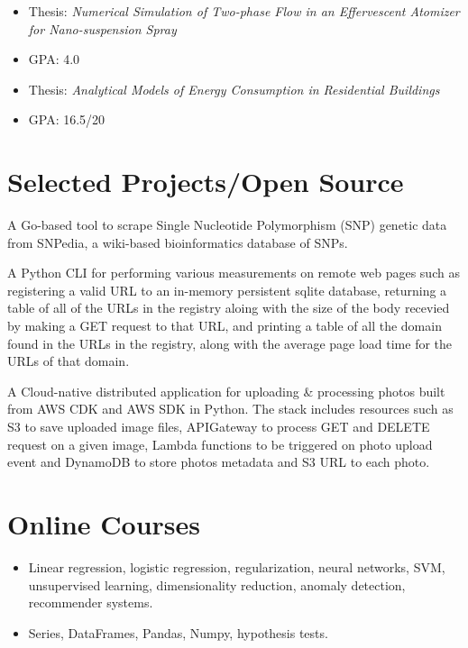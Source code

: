 \documentclass[11pt,a4paper,sans]{moderncv}
\begin{document}
{ \begin{itemize} \itemsep -1pt
  \item Thesis: \textit{Numerical Simulation of Two-phase Flow in an Effervescent Atomizer for Nano-suspension Spray}\item GPA: 4.0
\end{itemize} }

{ \begin{itemize} \itemsep -1pt
  \item Thesis: \textit{Analytical Models of Energy Consumption in Residential Buildings}
  \item GPA: 16.5/20
\end{itemize} }

\section{\textbf{Selected Projects/Open Source}}

  {A Go-based tool to scrape Single Nucleotide Polymorphism (SNP) genetic data from SNPedia, a wiki-based bioinformatics database of SNPs.}

  {A Python CLI for performing various measurements on remote web pages such as registering a valid URL to an in-memory persistent sqlite database, returning a table of all of the URLs in the registry aloing with the size of the body recevied by making a GET request to that URL, and printing a table of all the domain found in the URLs in the registry, along with the average page load time for the URLs of that domain.}

  {A Cloud-native distributed application for uploading \& processing photos built from AWS CDK and AWS SDK in Python. The stack includes resources such as S3 to save uploaded image files, APIGateway to process GET and DELETE request on a given image, Lambda functions to be triggered on photo upload event and DynamoDB to store photos metadata and S3 URL to each photo.}

\section{\textbf{Online Courses}}
{ \begin{itemize} \itemsep -1pt
   \item Linear regression, logistic regression, regularization, neural networks, SVM, unsupervised learning, dimensionality reduction, anomaly detection, recommender systems. 
\end{itemize}}

   { \begin{itemize} 
	\item Series, DataFrames, Pandas, Numpy, hypothesis tests.
\end{itemize} }
\end{document}
